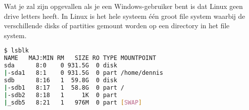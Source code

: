 Wat je zal zijn opgevallen als je een Windows-gebruiker bent is dat Linux geen drive letters heeft. In Linux is het hele systeem \'e\'en groot file system waarbij de verschillende disks of partities gemount worden op een directory in het file system.
\begin{lstlisting}[language=bash]
$ lsblk
NAME   MAJ:MIN RM   SIZE RO TYPE MOUNTPOINT
sda      8:0    0 931.5G  0 disk 
|-sda1   8:1    0 931.5G  0 part /home/dennis
sdb      8:16   1  59.8G  0 disk 
|-sdb1   8:17   1  58.8G  0 part /
|-sdb2   8:18   1     1K  0 part 
|_sdb5   8:21   1   976M  0 part [SWAP]
\end{lstlisting}

